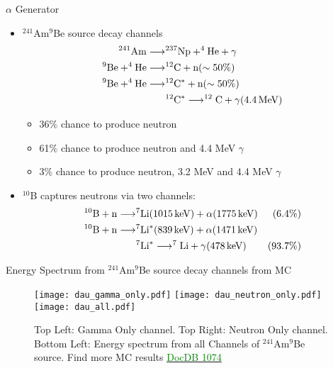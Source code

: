\documentclass[9pt]{beamer}
\begin{document}
\begin{frame}{$\alpha$ Generator}
\begin{itemize}
[bullet]
\item $^{241}$Am$^9$Be source decay channels
\begin{align}
^{241}\rm{Am} \longrightarrow &  ^{237}\rm{Np}+ ^{4}\rm{He} + \gamma  \\
^{9}\rm{Be} + ^{4}\rm{He}  \longrightarrow & ^{12}\rm{C} + n (\sim 50\%)   \\
^{9}\rm{Be} + ^{4}\rm{He}  \longrightarrow  & ^{12}\rm{C}^* + n (\sim 50\%)  \\
	& ^{12}\rm{C}^* \longrightarrow ^{12}\rm{C} + \gamma(4.4\,MeV)
\end{align}
	\begin{itemize}
	[default]
	\item 36$\%$ chance to produce neutron   
	\item 61$\%$ chance to produce neutron and 4.4 MeV $\gamma$
	\item 3$\%$ chance to produce neutron, 3.2 MeV and 4.4 MeV $\gamma$
	\end{itemize}
\item $^{10}$B captures neutrons via two channels:
\begin{align}
^{10}\rm{B} + n \longrightarrow  & ^{7}\rm{Li}(1015\, keV) + \alpha(1775\,keV)  & (6.4\%) \\
^{10}\rm{B} + n \longrightarrow  & ^{7}\rm{Li}^{*}(839\, keV) + \alpha(1471\, keV) &  \\
         & ^{7}\rm{Li}^{*}  \longrightarrow ^{7}\rm{Li} + \gamma(478\, keV)  & (93.7\%)
\end{align}
\end{itemize}
\end{frame}

\begin{frame}{Energy Spectrum from $^{241}$Am$^9$Be source decay channels from MC}
\begin{figure}
\texttt{[image: dau\_gamma\_only.pdf]}
\texttt{[image: dau\_neutron\_only.pdf]} \\
\texttt{[image: dau\_all.pdf]}
\caption{Top Left: Gamma Only channel. Top Right: Neutron Only channel. Bottom Left: Energy spectrum from all Channels  of $^{241}$Am$^9$Be source. Find more MC results \href{http://darkside-docdb.fnal.gov:8080/cgi-bin/RetrieveFile?docid=1074&filename=Alpha_Jan17.pdf&version=3}{\textcolor{green}{DocDB 1074}} }
\end{figure}
\end{frame}
\end{document}
